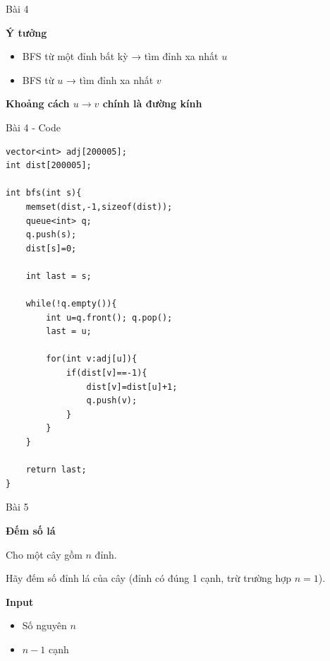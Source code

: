 \begin{frame}{Bài 4}

\textbf{Ý tưởng}

\vspace{0.4cm}

\begin{itemize}
\item BFS từ một đỉnh bất kỳ → tìm đỉnh xa nhất $u$
\item BFS từ $u$ → tìm đỉnh xa nhất $v$
\end{itemize}

\vspace{0.3cm}

\textbf{Khoảng cách $u \rightarrow v$ chính là đường kính}

\end{frame}
\begin{frame}[fragile]{Bài 4 - Code}

\begin{lstlisting}
vector<int> adj[200005];
int dist[200005];

int bfs(int s){
    memset(dist,-1,sizeof(dist));
    queue<int> q;
    q.push(s);
    dist[s]=0;

    int last = s;

    while(!q.empty()){
        int u=q.front(); q.pop();
        last = u;

        for(int v:adj[u]){
            if(dist[v]==-1){
                dist[v]=dist[u]+1;
                q.push(v);
            }
        }
    }

    return last;
}
\end{lstlisting}

\end{frame}

\begin{frame}{Bài 5}

\begin{center}
\textbf{Đếm số lá}
\end{center}

{\small
Cho một cây gồm $n$ đỉnh.

Hãy đếm số đỉnh lá của cây (đỉnh có đúng 1 cạnh, trừ trường hợp $n=1$).
}

\vspace{0.3cm}

\textbf{Input}
\begin{itemize}
\item Số nguyên $n$
\item $n-1$ cạnh
\end{itemize}

\end{frame}

